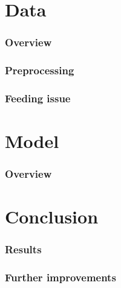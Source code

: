 \documentclass[a4paper,12pt]{article}
\begin{document}

\part{Data}
\section{Overview}
\section{Preprocessing}
\section{Feeding issue}


\part{Model}
\section{Overview}


\part{Conclusion}
\section{Results}
\section{Further improvements}
\end{document}
